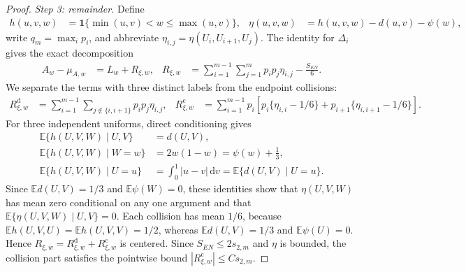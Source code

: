 \begin{proof}
\medskip\noindent
\emph{Step 3: remainder.}
Define
\begin{align*}
  h(u,v,w)
  &=\mathbf{1}\{\min(u,v)<w\leq\max(u,v)\},
  &
  \eta(u,v,w)
  &=h(u,v,w)-d(u,v)-\psi(w),
\end{align*}
write $q_m=\max_i p_i$, and abbreviate $\eta_{i,j}=\eta(U_i,U_{i+1},U_j)$.
The identity for $\Delta_i$ gives the exact decomposition
\begin{align*}
  A_w-\mu_{A,w}
  &=L_w+R_{\xi,w},
  &
  R_{\xi,w}
  &=\sum_{i=1}^{m-1}\sum_{j=1}^m
    p_ip_j\eta_{i,j}-\frac{S_{EN}}6.
\end{align*}
We separate the terms with three distinct labels from the endpoint
collisions:
\begin{align*}
  R_{\xi,w}^{\mathrm d}
  &=\sum_{i=1}^{m-1}
    \sum_{j\notin\{i,i+1\}}p_ip_j\eta_{i,j},
  &
  R_{\xi,w}^{\mathrm c}
  &=\sum_{i=1}^{m-1}p_i\left[
      p_i\{\eta_{i,i}-1/6\}
      +p_{i+1}\{\eta_{i,i+1}-1/6\}
    \right].
\end{align*}
For three independent uniforms, direct conditioning gives
\begin{align*}
  \mathbb E\{h(U,V,W)\mid U,V\}
  &=d(U,V),\\
  \mathbb E\{h(U,V,W)\mid W=w\}
  &=2w(1-w)=\psi(w)+\frac13,\\
  \mathbb E\{h(U,V,W)\mid U=u\}
  &=\int_0^1|u-v|\,\mathrm{d}v
   =\mathbb E\{d(U,V)\mid U=u\}.
\end{align*}
Since $\mathbb E d(U,V)=1/3$ and $\mathbb E\psi(W)=0$, these identities show
that $\eta(U,V,W)$ has mean zero conditional on any one argument and that
$\mathbb E\{\eta(U,V,W)\mid U,V\}=0$. Each collision has mean $1/6$, because
$\mathbb E h(U,V,U)=\mathbb E h(U,V,V)=1/2$, whereas
$\mathbb E d(U,V)=1/3$ and $\mathbb E\psi(U)=0$. Hence
$R_{\xi,w}=R_{\xi,w}^{\mathrm d}+R_{\xi,w}^{\mathrm c}$ is centered. Since
$S_{EN}\leq 2s_{2,m}$ and $\eta$ is bounded, the collision part satisfies
the pointwise bound $|R_{\xi,w}^{\mathrm c}|\leq C s_{2,m}$.


\end{proof}
